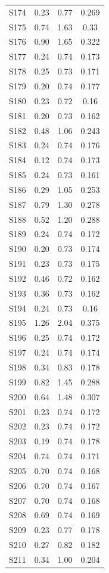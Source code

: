 {\begin{longtable}{l S[table-format=7.2] S[table-format=7.2] S[table-format=7.3]}
S174 & 0.23 & 0.77 & 0.269 \\
S175 & 0.74 & 1.63 & 0.33 \\
S176 & 0.90 & 1.65 & 0.322 \\
S177 & 0.24 & 0.74 & 0.173 \\
S178 & 0.25 & 0.73 & 0.171 \\
S179 & 0.20 & 0.74 & 0.177 \\
S180 & 0.23 & 0.72 & 0.16 \\
S181 & 0.20 & 0.73 & 0.162 \\
S182 & 0.48 & 1.06 & 0.243 \\
S183 & 0.24 & 0.74 & 0.176 \\
S184 & 0.12 & 0.74 & 0.173 \\
S185 & 0.24 & 0.73 & 0.161 \\
S186 & 0.29 & 1.05 & 0.253 \\
S187 & 0.79 & 1.30 & 0.278 \\
S188 & 0.52 & 1.20 & 0.288 \\
S189 & 0.24 & 0.74 & 0.172 \\
S190 & 0.20 & 0.73 & 0.174 \\
S191 & 0.23 & 0.73 & 0.175 \\
S192 & 0.46 & 0.72 & 0.162 \\
S193 & 0.36 & 0.73 & 0.162 \\
S194 & 0.24 & 0.73 & 0.16 \\
S195 & 1.26 & 2.04 & 0.375 \\
S196 & 0.25 & 0.74 & 0.172 \\
S197 & 0.24 & 0.74 & 0.174 \\
S198 & 0.34 & 0.83 & 0.178 \\
S199 & 0.82 & 1.45 & 0.288 \\
S200 & 0.64 & 1.48 & 0.307 \\
S201 & 0.23 & 0.74 & 0.172 \\
S202 & 0.23 & 0.74 & 0.172 \\
S203 & 0.19 & 0.74 & 0.178 \\
S204 & 0.74 & 0.74 & 0.171 \\
S205 & 0.70 & 0.74 & 0.168 \\
S206 & 0.70 & 0.74 & 0.167 \\
S207 & 0.70 & 0.74 & 0.168 \\
S208 & 0.69 & 0.74 & 0.169 \\
S209 & 0.23 & 0.77 & 0.178 \\
S210 & 0.27 & 0.82 & 0.182 \\
S211 & 0.34 & 1.00 & 0.204 \\

\end{longtable}}

